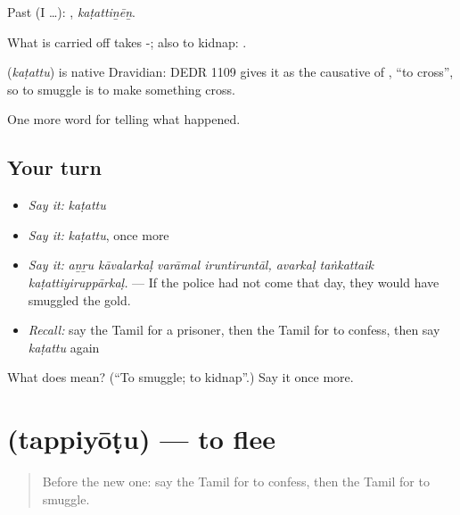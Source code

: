 Past (I …): , \emph{kaṭattiṉēṉ}.

What is carried off takes -; also to kidnap:  .

\begin{cousinweb}
\textbf{} (\emph{kaṭattu}) is native Dravidian: DEDR 1109 gives it as the causative of , \textquotedblleft{}to cross\textquotedblright{}, so to smuggle is to make something cross.
\end{cousinweb}

\begin{grammarlens}[title={What you've built}]
One more word for telling what happened.
\end{grammarlens}

\subsection*{Your turn}
\begin{itemize}
\raggedright
  \item \emph{Say it:} \emph{kaṭattu}
  \item \emph{Say it:} \emph{kaṭattu}, once more
  \item \emph{Say it:} \emph{aṉṟu kāvalarkaḷ varāmal iruntiruntāl, avarkaḷ taṅkattaik kaṭattiyiruppārkaḷ.} — If the police had not come that day, they would have smuggled the gold.
  \item \emph{Recall:} say the Tamil for a prisoner, then the Tamil for to confess, then say \emph{kaṭattu} again
\end{itemize}

\begin{tcolorbox}[breakable,colback=teal!4,colframe=teal!35!black,title={Before you move on}]
What does  mean? (\textquotedblleft{}To smuggle; to kidnap\textquotedblright{}.) Say it once more.
\end{tcolorbox}
\section[\texorpdfstring{\ta{தப்பியோடு} (tappiyōṭu)}{தப்பியோடு (tappiyōṭu)}]{ (tappiyōṭu) — to flee}

\label{lesson:TA-C297-tappiyotu}



\begin{quote}
Before the new one: say the Tamil for to confess, then the Tamil for to smuggle.
\end{quote}

